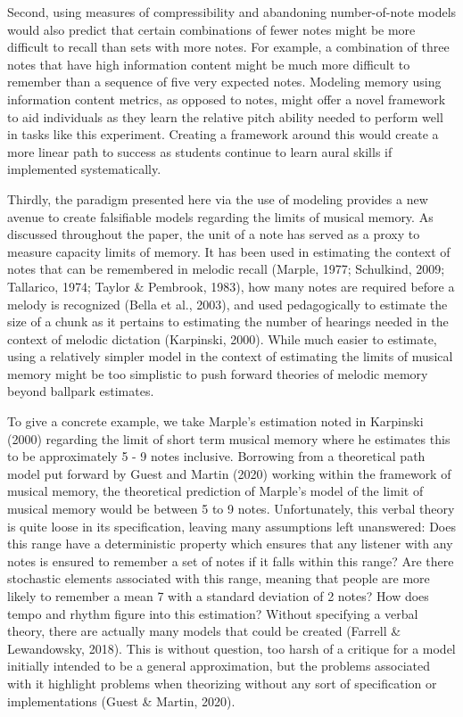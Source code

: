 \documentclass[english,man,floatsintext]{apa6}
\begin{document}
Second, using measures of compressibility and abandoning number-of-note models would also predict that certain combinations of fewer notes might be more difficult to recall than sets with more notes.
For example, a combination of three notes that have high information content might be much more difficult to remember than a sequence of five very expected notes. Modeling memory using information content metrics, as opposed to notes, might offer a novel framework to aid individuals as they learn the relative pitch ability needed to perform well in tasks like this experiment.
Creating a framework around this would create a more linear path to success as students continue to learn aural skills if implemented systematically.

Thirdly, the paradigm presented here via the use of modeling provides a new avenue to create falsifiable models regarding the limits of musical memory.
As discussed throughout the paper, the unit of a note has served as a proxy to measure capacity limits of memory. It has been used in estimating the context of notes that can be remembered in melodic recall (Marple, 1977; Schulkind, 2009; Tallarico, 1974; Taylor \& Pembrook, 1983), how many notes are required before a melody is recognized (Bella et al., 2003), and used pedagogically to estimate the size of a chunk as it pertains to estimating the number of hearings needed in the context of melodic dictation (Karpinski, 2000).
While much easier to estimate, using a relatively simpler model in the context of estimating the limits of musical memory might be too simplistic to push forward theories of melodic memory beyond ballpark estimates.

To give a concrete example, we take Marple's estimation noted in Karpinski (2000) regarding the limit of short term musical memory where he estimates this to be approximately 5 - 9 notes inclusive.
Borrowing from a theoretical path model put forward by Guest and Martin (2020) working within the framework of musical memory, the theoretical prediction of Marple's model of the limit of musical memory would be between 5 to 9 notes.
Unfortunately, this verbal theory is quite loose in its specification, leaving many assumptions left unanswered:
Does this range have a deterministic property which ensures that any listener with any notes is ensured to remember a set of notes if it falls within this range?
Are there stochastic elements associated with this range, meaning that people are more likely to remember a mean 7 with a standard deviation of 2 notes?
How does tempo and rhythm figure into this estimation?
Without specifying a verbal theory, there are actually many models that could be created (Farrell \& Lewandowsky, 2018).
This is without question, too harsh of a critique for a model initially intended to be a general approximation, but the problems associated with it highlight problems when theorizing without any sort of specification or implementations (Guest \& Martin, 2020).
\end{document}
